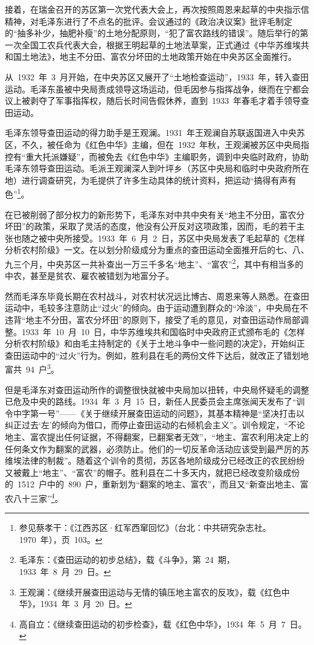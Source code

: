 接着，在瑞金召开的苏区第一次党代表大会上，再次按照周恩来起草的中央指示信精神，对毛泽东进行了不点名的批评。会议通过的《政治决议案》批评毛制定的“抽多补少，抽肥补瘦”的土地分配原则，“犯了富农路线的错误”。随后举行的第一次全国工农兵代表大会，根据王明起草的土地法草案，正式通过《中华苏维埃共和国土地法》，地主不分田、富农分坏田的土地政策开始在中央苏区全面推行。

从~1932~年~3~月开始，在中央苏区又展开了“土地检查运动”，1933~年，转入查田运动。毛泽东虽被中央局责成领导这场运动，但毛因参与指挥战争，继而在宁都会议上被剥夺了军事指挥权，随后长时间告假休养，直到~1933~年春毛才着手领导查田运动。

毛泽东领导查田运动的得力助手是王观澜。1931~年王观澜自苏联返国进入中央苏区，不久，被任命为《红色中华》主编，但在~1932~年秋，王观澜被苏区中央局指控有“重大托派嫌疑”，而被免去《红色中华》主编职务，调到中央临时政府，协助毛泽东领导查田运动。毛派王观澜深人到叶坪乡（苏区中央局和临时中央政府所在地）进行调查研究，为毛提供了许多生动具体的统计资料，把运动“搞得有声有色”\footnote{参见蔡孝干：《江西苏区·红军西窜回忆》（台北：中共研究杂志社。1970~年），页~103。}。

在已被削弱了部分权力的新形势下，毛泽东对中共中央有关“地主不分田，富农分坏田”的政策，采取了灵活的态度，他没有公开反对这项政策，因而，毛的若干主张也随之被中央所接受。1933~年~6~月~2~日，苏区中央局发表了毛起草的《怎样分析农村阶级》一文。在以划分阶级成分为重点的查田运动全面推开后的七、八、九三个月，中央苏区一共补查出一万三千多名“地主”、“富农”\footnote{毛泽东：《查田运动的初步总结》，载《斗争》，第~24~期，1933~年~8~月~29~日。}，其中有相当多的中农，甚至是贫农、雇农被错划为地富分子。

然而毛泽东毕竟长期在农村战斗，对农村状况远比博古、周恩来等人熟悉。在查田运动中，毛较多注意防止“过火”的倾向。由于运动遭到群众的“冷淡”，中央局在不违背“地主不分田，富农分坏田”的原则下，接受了毛的意见，对查田运动作局部调整。1933~年~10~月~10~日，中华苏维埃共和国临时中央政府正式颁布毛的《怎样分析农村阶级》和由毛主持制定的《关于土地斗争中一些问题的决定》，开始纠正查田运动中的“过火”行为。例如，胜利县在毛的两份文件下达后，就改正了错划地富共~94~户\footnote{王观澜：《继续开展查田运动与无情的镇压地主富农的反攻》，载《红色中华》，1934~年~3~月~20~日。}。

但是毛泽东对查田运动所作的调整很快就被中央局加以扭转，中央局怀疑毛的调整已危及中央的路线。1934~年~3~月~15~日，新任人民委员会主席张闻天发布了“训令中字第一号”——《关于继续开展查田运动的问题》，其基本精神是“坚决打击以纠正过去‘左’的倾向为借口，而停止查田运动的右倾机会主义”。训令规定，“不论地主、富农提出任何证据，不得翻案，已翻案者无效”，“地主、富农利用决定上的任何条文作为翻案的武器，必须防止。他们的一切反革命活动应该受到最严厉的苏维埃法律的制裁”。随着这个训令的贯彻，苏区各地阶级成分已经改正的农民纷纷又被戴上“地主”、“富农”的帽子。胜利县在二十多天内，就把已经改变阶级成份的~1512~户中的~890~户，重新划为“翻案的地主、富农”，而且又“新查出地主、富农八十三家”\footnote{高自立：《继续查田运动的初步检查》，载《红色中华》，1934~年~5~月~7~日。}。

